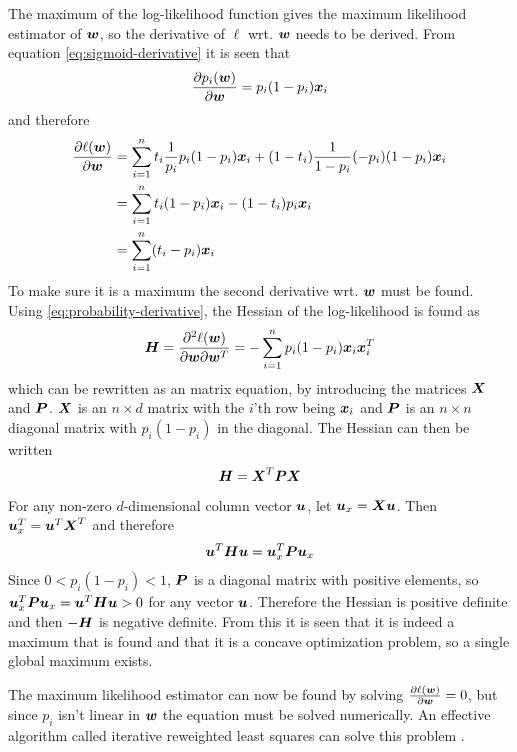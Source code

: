 The maximum of the log-likelihood function gives the maximum likelihood estimator of $\boldsymbol{w}$, so the derivative of $\ell$ wrt. $\boldsymbol{w}$ needs to be derived. From equation \eqref{eq:sigmoid-derivative} it is seen that
\begin{equation}\label{eq:probability-derivative}
    \frac{\partial p_i(\boldsymbol{w})}{\partial \boldsymbol{w}} = p_i(1-p_i)\boldsymbol{x}_i
\end{equation}
and therefore
\begin{align*}
    \frac{\partial \ell(\boldsymbol{w})}{\partial\boldsymbol{w}} &= \sum_{i=1}^n t_i \frac{1}{p_i}p_i(1-p_i)\boldsymbol{x}_i + (1-t_i)\frac{1}{1-p_i}(-p_i)(1-p_i)\boldsymbol{x}_i \\
    &= \sum_{i=1}^n t_i(1-p_i)\boldsymbol{x}_i - (1-t_i)p_i\boldsymbol{x}_i \\
    &= \sum_{i=1}^n (t_i-p_i)\boldsymbol{x}_i
\end{align*}
To make sure it is a maximum the second derivative wrt. $\boldsymbol{w}$ must be found. Using \eqref{eq:probability-derivative}, the Hessian of the log-likelihood is found as
\begin{align*}
    \boldsymbol{H} = \frac{\partial^2\ell(\boldsymbol{w})}{\partial\boldsymbol{w}\partial\boldsymbol{w}^T} = - \sum_{i=1}^n p_i(1-p_i)\boldsymbol{x}_i\boldsymbol{x}_i^T
\end{align*}
which can be rewritten as an matrix equation, by introducing the matrices $\boldsymbol{X}$ and $\boldsymbol{P}$. $\boldsymbol{X}$ is an $n\times d$ matrix with the $i$'th row being $\boldsymbol{x}_i$ and $\boldsymbol{P}$ is an $n\times n$ diagonal matrix with $p_i(1-p_i)$ in the diagonal. The Hessian can then be written
\[
    \boldsymbol{H} = \boldsymbol{X}^T\boldsymbol{P}\boldsymbol{X}
\]
For any non-zero $d$-dimensional column vector $\boldsymbol{u}$, let $\boldsymbol{u}_x = \boldsymbol{X}\boldsymbol{u}$. Then $\boldsymbol{u}_x^T = \boldsymbol{u}^T\boldsymbol{X}^T$ and therefore
\begin{align*}
    \boldsymbol{u}^T\boldsymbol{H}\boldsymbol{u} = \boldsymbol{u}_x^T\boldsymbol{P}\boldsymbol{u}_x
\end{align*}
Since $0<p_i(1-p_i)<1$, $\boldsymbol{P}$ is a diagonal matrix with positive elements, so $\boldsymbol{u}_x^T\boldsymbol{P}\boldsymbol{u}_x=\boldsymbol{u}^T\boldsymbol{H}\boldsymbol{u}>0$ for any vector $\boldsymbol{u}$. Therefore the Hessian is positive definite and then $-\boldsymbol{H}$ is negative definite. From this it is seen that it is indeed a maximum that is found and that it is a concave optimization problem, so a single global maximum exists. \par
The maximum likelihood estimator can now be found by solving $\frac{\partial\ell(\boldsymbol{w})}{\partial\boldsymbol{w}}=0$, but since $p_i$ isn't linear in $\boldsymbol{w}$ the equation must be solved numerically. An effective algorithm called iterative reweighted least squares can solve this problem \citep[p.207]{bishop}.


